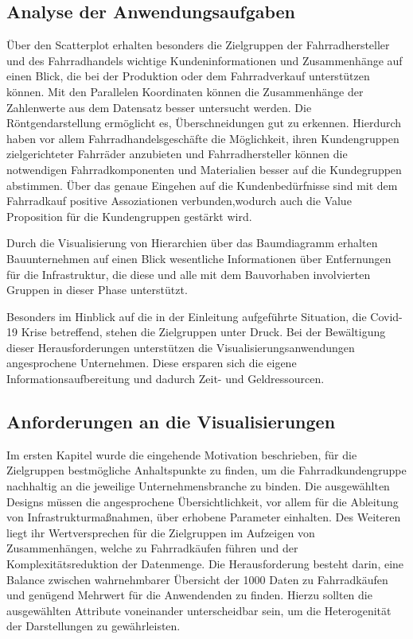 \documentclass[usegeometry=true]{scrartcl}
\begin{document}
\subsection{Analyse der Anwendungsaufgaben}
Über den Scatterplot erhalten besonders die Zielgruppen der Fahrradhersteller und des Fahrradhandels wichtige Kundeninformationen und Zusammenhänge auf einen Blick, die bei der Produktion oder dem Fahrradverkauf unterstützen können. 
Mit den Parallelen Koordinaten können die Zusammenhänge der Zahlenwerte aus dem Datensatz besser untersucht werden. Die Röntgendarstellung ermöglicht es, Überschneidungen gut zu erkennen. Hierdurch haben vor allem Fahrradhandelsgeschäfte die Möglichkeit, ihren Kundengruppen zielgerichteter Fahrräder anzubieten und Fahrradhersteller können die notwendigen Fahrradkomponenten und Materialien besser auf die Kundegruppen abstimmen.
Über das genaue Eingehen auf die Kundenbedürfnisse sind mit dem Fahrradkauf positive Assoziationen verbunden,wodurch auch die Value Proposition für die Kundengruppen gestärkt wird. 


Durch die Visualisierung von Hierarchien über das Baumdiagramm erhalten Bauunternehmen auf einen Blick wesentliche Informationen über Entfernungen für die Infrastruktur, die diese und alle mit dem Bauvorhaben involvierten Gruppen in dieser Phase unterstützt.

Besonders im Hinblick auf die in der Einleitung aufgeführte Situation, die Covid-19 Krise betreffend, stehen die Zielgruppen unter Druck. Bei der Bewältigung dieser Herausforderungen unterstützen die Visualisierungsanwendungen angesprochene Unternehmen. Diese ersparen sich die eigene Informationsaufbereitung und dadurch Zeit- und Geldressourcen. 
\subsection{Anforderungen an die Visualisierungen}
Im ersten Kapitel wurde die eingehende Motivation beschrieben, für die Zielgruppen bestmögliche Anhaltspunkte zu finden, um die Fahrradkundengruppe nachhaltig an die jeweilige Unternehmensbranche zu binden. Die ausgewählten Designs müssen die angesprochene Übersichtlichkeit, vor allem für die Ableitung von Infrastrukturmaßnahmen, über erhobene Parameter einhalten. Des Weiteren liegt ihr Wertversprechen für die Zielgruppen im Aufzeigen von Zusammenhängen, welche zu Fahrradkäufen führen und der Komplexitätsreduktion der Datenmenge. Die Herausforderung besteht darin, eine Balance zwischen wahrnehmbarer Übersicht der 1000 Daten zu Fahrradkäufen und genügend Mehrwert für die Anwendenden zu finden. Hierzu sollten die ausgewählten Attribute voneinander unterscheidbar sein, um die Heterogenität der Darstellungen zu gewährleisten.
\end{document}
